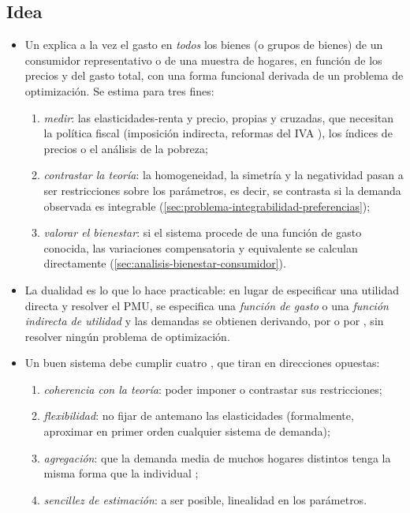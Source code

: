 \documentclass[11pt]{article}
\begin{document}
\subsection{Idea}\label{sec:idea}

\begin{itemize}
\item Un  explica a la vez el gasto en \emph{todos} los bienes (o grupos de bienes) de un consumidor representativo o de una muestra de hogares, en función de los precios y del gasto total, con una forma funcional derivada de un problema de optimización. Se estima para tres fines\nocite{DeatonMuellbauer1980Economics}:
  \begin{enumerate}
  \item \emph{medir}: las elasticidades-renta y precio, propias y cruzadas, que necesitan la política fiscal (imposición indirecta, reformas del IVA ), los índices de precios o el análisis de la pobreza\nocite{Deaton1997Analysis};
  \item \emph{contrastar la teoría}: la homogeneidad, la simetría y la negatividad pasan a ser restricciones sobre los parámetros, es decir, se contrasta si la demanda observada es integrable (\ref{sec:problema-integrabilidad-preferencias});
  \item \emph{valorar el bienestar}: si el sistema procede de una función de gasto conocida, las variaciones compensatoria y equivalente se calculan directamente (\ref{sec:analisis-bienestar-consumidor}).
  \end{enumerate}
\item La dualidad es lo que lo hace practicable: en lugar de especificar una utilidad directa y resolver el PMU, se especifica una \emph{función de gasto} o una \emph{función indirecta de utilidad} y las demandas se obtienen derivando, por  o por , sin resolver ningún problema de optimización.
\item Un buen sistema debe cumplir cuatro , que tiran en direcciones opuestas\nocite{DeatonMuellbauer1980AIDS}:
  \begin{enumerate}
  \item \emph{coherencia con la teoría}: poder imponer o contrastar sus restricciones;
  \item \emph{flexibilidad}: no fijar de antemano las elasticidades (formalmente, aproximar en primer orden cualquier sistema de demanda);
  \item \emph{agregación}: que la demanda media de muchos hogares distintos tenga la misma forma que la individual ;
  \item \emph{sencillez de estimación}: a ser posible, linealidad en los parámetros.
  \end{enumerate}
\end{itemize}
\end{document}

